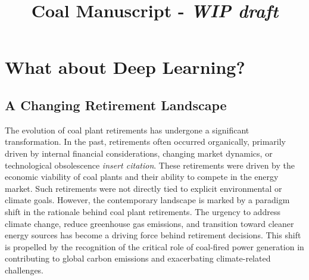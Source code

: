 \documentclass{article}
\title{Coal Manuscript - \textit{WIP draft}}
\author{}
\date{}
\begin{document}
\maketitle


















\section{What about Deep Learning?}

\subsection{A Changing Retirement Landscape}

The evolution of coal plant retirements has undergone a significant transformation. In the past, retirements often occurred organically, primarily driven by internal financial considerations, changing market dynamics, or technological obsolescence \textit{insert citation}. These retirements were driven by the economic viability of coal plants and their ability to compete in the energy market. Such retirements were not directly tied to explicit environmental or climate goals. However, the contemporary landscape is marked by a paradigm shift in the rationale behind coal plant retirements. The urgency to address climate change, reduce greenhouse gas emissions, and transition toward cleaner energy sources has become a driving force behind retirement decisions. This shift is propelled by the recognition of the critical role of coal-fired power generation in contributing to global carbon emissions and exacerbating climate-related challenges.
\end{document}
